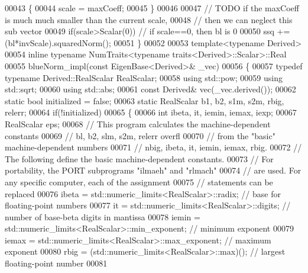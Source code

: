 \begin{DoxyCode}
00043   \{
00044     scale = maxCoeff;
00045   \}
00046   
00047   \textcolor{comment}{// TODO if the maxCoeff is much much smaller than the current scale,}
00048   \textcolor{comment}{// then we can neglect this sub vector}
00049   \textcolor{keywordflow}{if}(scale>Scalar(0)) \textcolor{comment}{// if scale==0, then bl is 0 }
00050     ssq += (bl*invScale).squaredNorm();
00051 \}
00052 
00053 \textcolor{keyword}{template}<\textcolor{keyword}{typename} Derived>
00054 \textcolor{keyword}{inline} \textcolor{keyword}{typename} NumTraits<typename traits<Derived>::Scalar>::Real
00055 blueNorm\_impl(\textcolor{keyword}{const} EigenBase<Derived>& \_vec)
00056 \{
00057   \textcolor{keyword}{typedef} \textcolor{keyword}{typename} Derived::RealScalar RealScalar;  
00058   \textcolor{keyword}{using} std::pow;
00059   \textcolor{keyword}{using} std::sqrt;
00060   \textcolor{keyword}{using} std::abs;
00061   \textcolor{keyword}{const} Derived& vec(\_vec.derived());
00062   \textcolor{keyword}{static} \textcolor{keywordtype}{bool} initialized = \textcolor{keyword}{false};
00063   \textcolor{keyword}{static} RealScalar b1, b2, s1m, s2m, rbig, relerr;
00064   \textcolor{keywordflow}{if}(!initialized)
00065   \{
00066     \textcolor{keywordtype}{int} ibeta, it, iemin, iemax, iexp;
00067     RealScalar eps;
00068     \textcolor{comment}{// This program calculates the machine-dependent constants}
00069     \textcolor{comment}{// bl, b2, slm, s2m, relerr overfl}
00070     \textcolor{comment}{// from the "basic" machine-dependent numbers}
00071     \textcolor{comment}{// nbig, ibeta, it, iemin, iemax, rbig.}
00072     \textcolor{comment}{// The following define the basic machine-dependent constants.}
00073     \textcolor{comment}{// For portability, the PORT subprograms "ilmaeh" and "rlmach"}
00074     \textcolor{comment}{// are used. For any specific computer, each of the assignment}
00075     \textcolor{comment}{// statements can be replaced}
00076     ibeta = std::numeric\_limits<RealScalar>::radix;                 \textcolor{comment}{// base for floating-point numbers}
00077     it    = std::numeric\_limits<RealScalar>::digits;                \textcolor{comment}{// number of base-beta digits in
       mantissa}
00078     iemin = std::numeric\_limits<RealScalar>::min\_exponent;          \textcolor{comment}{// minimum exponent}
00079     iemax = std::numeric\_limits<RealScalar>::max\_exponent;          \textcolor{comment}{// maximum exponent}
00080     rbig  = (std::numeric\_limits<RealScalar>::max)();               \textcolor{comment}{// largest floating-point number}
00081 

\end{DoxyCode}
